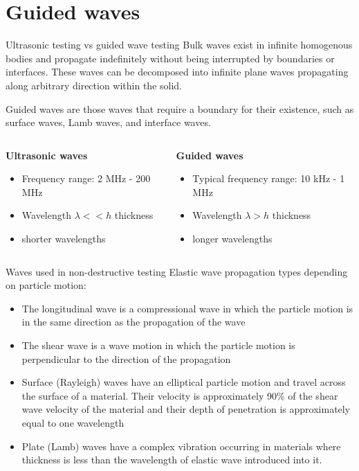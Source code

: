 \documentclass[10pt,aspectratio=169]{beamer} %
\begin{document}
\section{Guided waves}
\begin{frame}{Ultrasonic testing vs guided wave testing}
	\alert{Bulk waves} exist in infinite homogenous bodies and propagate indefinitely without being interrupted by boundaries or interfaces. 
	These waves can be decomposed into infinite plane waves propagating along arbitrary direction within the solid.
	
	\alert{Guided waves} are those waves that require a boundary for their existence, such as surface waves, Lamb waves, and interface waves.
	\vspace{5mm}
	\begin{columns}[T]
		\begin{column}{0.5\textwidth}
			\textbf{Ultrasonic waves}	
			\begin{itemize}
				\item Frequency range: 2 MHz - 200 MHz
				\item Wavelength \(\lambda << h\) thickness 
				\item shorter wavelengths
			\end{itemize}
		\end{column}
		\begin{column}{0.5\textwidth}
			\textbf{Guided waves}	
			\begin{itemize}
				\item Typical frequency range: 10 kHz - 1 MHz
				\item Wavelength \(\lambda > h\) thickness 
				\item longer wavelengths
			\end{itemize}
		\end{column}
	\end{columns}			
\end{frame}
\begin{frame}{Waves used in non-destructive testing}
	Elastic wave propagation types depending on particle motion:
	\begin{itemize}
		\item  \alert{The longitudinal wave} is a compressional wave in which the particle motion is in the same direction as the propagation of the wave
		\item \alert{The shear wave} is a wave motion in which the particle motion is perpendicular to the direction of the propagation
		\item \alert{Surface (Rayleigh) waves} have an elliptical particle motion and travel across the surface of a material. Their velocity is approximately 90\% of the shear wave velocity of the material and their depth of penetration is approximately equal to one
		wavelength
		\item \alert{Plate (Lamb) waves} have a complex vibration occurring in materials where thickness is less than the wavelength of elastic wave introduced into it.
	\end{itemize}
\end{frame}
\end{document}
